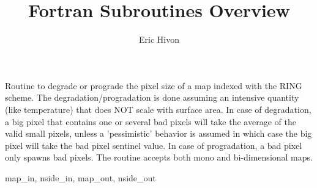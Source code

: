 
\sloppy


\title{\healpix Fortran Subroutines Overview}
 \section[udgrade\_ring*]{ }
\label{sub:udgrade_ring}
\author{Eric Hivon}


\begin{facility}
{Routine to degrade or prograde the pixel size of a \healpix map indexed with
  the RING scheme. The degradation/progradation is done assuming an
intensive quantity (like temperature) that does NOT scale with surface area. \newline
In case of degradation, a big pixel that contains one or several bad pixels will
take the average of the valid small pixels, unless a 'pessimistic' behavior
is assumed in which case the big pixel will take the bad pixel sentinel value.
In case of progradation, a bad pixel only spawns bad pixels.\newline
The routine accepts both mono and bi-dimensional maps.
}
{\modUdgradeNr}
\end{facility}

\begin{f90format}
{map\_in, nside\_in, map\_out, nside\_out }
\end{f90format}
\aboutoptional

